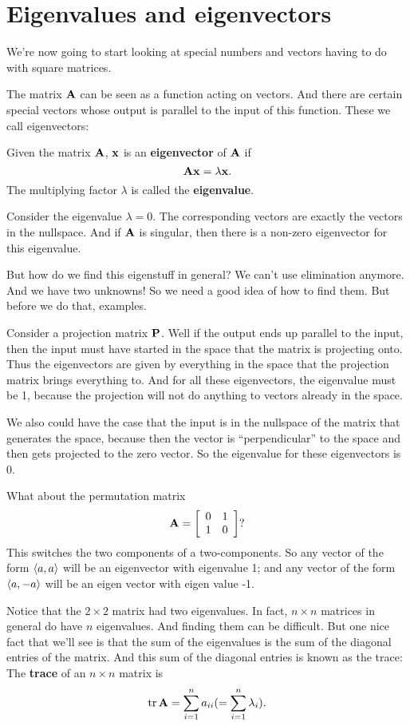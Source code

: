 \section{Eigenvalues and eigenvectors}

We're now going to start looking at special numbers and vectors having to do with square matrices.

The matrix $\boldsymbol{\mathbf{A}}$ can be seen as a function acting on vectors. And there are certain special vectors whose output is parallel to the input of this function. These we call eigenvectors:

\bdf
Given the matrix $\boldsymbol{\mathbf{A}}$, $\boldsymbol{\mathbf{x}}$ is an \textbf{eigenvector} of $\boldsymbol{\mathbf{A}}$ if
\[ \boldsymbol{\mathbf{A}}\boldsymbol{\mathbf{x}} = \lambda \boldsymbol{\mathbf{x}}. \]
The multiplying factor $\lambda$ is called the \textbf{eigenvalue}.
\edf

Consider the eigenvalue $\lambda = 0$. The corresponding vectors are exactly the vectors in the nullspace. And if $\boldsymbol{\mathbf{A}}$ is singular, then there is a non-zero eigenvector for this eigenvalue.

But how do we find this eigenstuff in general? We can't use elimination anymore. And we have two unknowns! So we need a good idea of how to find them. But before we do that, examples.

\bex
Consider a projection matrix $\boldsymbol{\mathbf{P}}$. Well if the output ends up parallel to the input, then the input must have started in the space that the matrix is projecting onto. Thus the eigenvectors are given by everything in the space that the projection matrix brings everything to. And for all these eigenvectors, the eigenvalue must be 1, because the projection will not do anything to vectors already in the space. 

We also could have the case that the input is in the nullspace of the matrix that generates the space, because then the vector is ``perpendicular'' to the space and then gets projected to the zero vector. So the eigenvalue for these eigenvectors is 0.
\eex

\bex
What about the permutation matrix
\[ \boldsymbol{\mathbf{A}} = \left[ \begin{array}{rrrrrrrrrrrrrrrrrrrrrrrrr} 0&1\\1&0\\ \end{array} \right]? \]
This switches the two components of a two-components. So any vector of the form $\langle a, a \rangle$ will be an eigenvector with eigenvalue 1; and any vector of the form $\langle a, -a \rangle$ will be an eigen vector with eigen value -1.
\eex

\brm
Notice that the $2 \times 2$ matrix had two eigenvalues. In fact, $n \times n$ matrices in general do have $n$ eigenvalues. And finding them can be difficult. But one nice fact that we'll see is that the sum of the eigenvalues is the sum of the diagonal entries of the matrix. And this sum of the diagonal entries is known as the trace:
\bdf
The \textbf{trace} of an $n \times n$ matrix is
\[ \mathrm{tr}\, \boldsymbol{\mathbf{A}} = \sum_{i=1}^n a_{ii} (= \sum_{i=1}^n \lambda_i). \]
\edf
\erm

